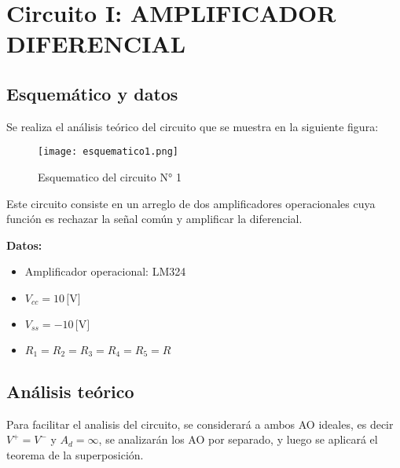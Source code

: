 %
 \section{Circuito I: AMPLIFICADOR DIFERENCIAL}

\subsection{Esquemático y datos}

Se realiza el análisis teórico del circuito que se muestra en la siguiente figura: 
  \begin{figure}[h!]
     \centering
	 \texttt{[image: esquematico1.png]}
	 \caption{Esquematico del circuito N° 1}
	 \label{fig:esquematico1}
  \end{figure}
Este circuito consiste en un arreglo de dos amplificadores operacionales cuya función es rechazar la señal común y amplificar la diferencial.

\textbf{Datos:}

\begin{itemize}
  \item Amplificador operacional: LM324
  \item $V_{cc} = 10 \, \text{[V]}$
  \item $V_{ss} = -10 \, \text{[V]}$
  \item $R_1 = R_2 = R_3 = R_4 = R_5 = R$
\end{itemize}

\subsection{Análisis teórico}
Para facilitar el analisis del circuito, se considerará a ambos AO ideales, es decir $V^+=V ^-$ y $A_d=\infty$, se analizarán los AO por separado, y luego se aplicará el teorema de la superposición.

\vspace{1em}

